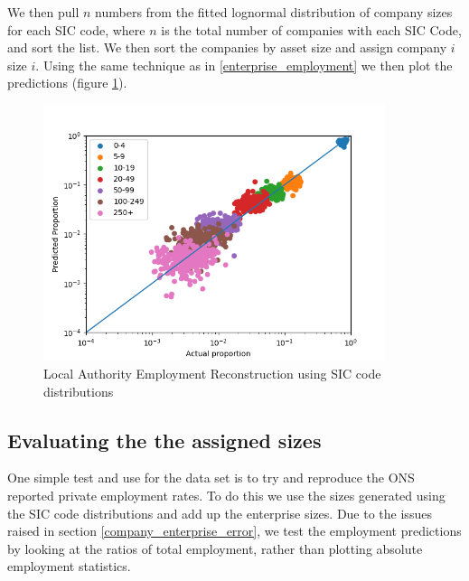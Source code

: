 \documentclass[a4paper,10pt]{article}
\begin{document}
   We then pull $n$ numbers from the fitted lognormal distribution of company sizes for each SIC code, where $n$ is the total number of companies with each SIC Code, and sort the list. We then sort the companies by asset size and assign company $i$ size $i$. Using the same technique as in \ref{enterprise_employment} we then plot the predictions (figure \ref{enterprise_employment_reconstruction_using_sic}).
  	\begin{figure}
      \begin{center}
         \includegraphics[width=10cm]{graphs/2014_la_reconstruction}
         \caption{Local Authority Employment Reconstruction using SIC code distributions}
         \label{enterprise_employment_reconstruction_using_sic}
      \end{center}
   \end{figure}


   \subsection{Evaluating the the assigned sizes}

   One simple test and use for the data set is to try and reproduce the ONS reported private employment rates. To do this we use the sizes generated using the SIC code distributions and add up the enterprise sizes. Due to the issues raised in section \ref{company_enterprise_error}, we test the employment predictions by looking at the ratios of total employment, rather than plotting absolute employment statistics.
\end{document}
